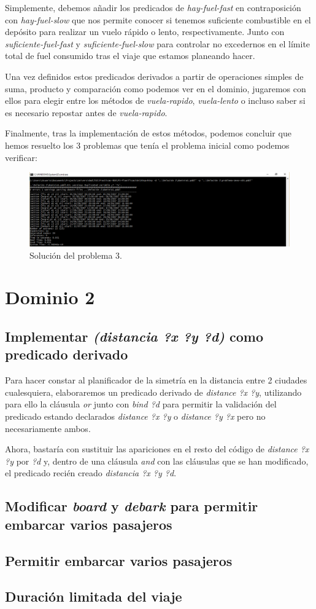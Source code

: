 \documentclass[a4paper, 11pt]{article}
\begin{document}
		Simplemente, debemos añadir los predicados de \textit{hay-fuel-fast} en contraposición con
		\textit{hay-fuel-slow} que nos permite conocer si tenemos suficiente combustible en el depósito
		para realizar un vuelo rápido o lento, respectivamente. Junto con \textit{suficiente-fuel-fast} y
		\textit{suficiente-fuel-slow} para controlar no excedernos en el límite total de fuel consumido tras
		el viaje que estamos planeando hacer.
		
		Una vez definidos estos predicados derivados a partir de operaciones simples de suma, producto y
		comparación como podemos ver en el dominio, jugaremos con ellos para elegir entre los métodos de
		\textit{vuela-rapido}, \textit{vuela-lento} o incluso saber si es necesario repostar antes de
		\textit{vuela-rapido}.
		
		Finalmente, tras la implementación de estos métodos, podemos concluir que hemos resuelto los 3
		problemas que tenía el problema inicial como podemos verificar:
		\begin{figure}[H]
			\centering
			\includegraphics[width=15cm]{Ej1-problema3.png}
			\caption{Solución del problema 3.}
			\label{Prob-3}
		\end{figure}

\section{Dominio 2}
	\subsection{Implementar \textit{(distancia ?x ?y ?d)} como predicado derivado}
	Para hacer constar al planificador de la simetría en la distancia entre 2 ciudades cualesquiera,
	elaboraremos un predicado derivado de \textit{distance ?x ?y}, utilizando para ello la cláusula
	\textit{or} junto con \textit{bind ?d} para permitir la validación del predicado estando declarados
	\textit{distance ?x ?y} o \textit{distance ?y ?x} pero no necesariamente ambos.
	
	Ahora, bastaría con sustituir las apariciones en el resto del código de \textit{distance ?x ?y}
	por \textit{?d} y, dentro de una cláusula \textit{and} con las cláusulas que se han modificado, el
	predicado recién creado \textit{distancia ?x ?y ?d}.
	
	\subsection{Modificar \textit{board} y \textit{debark} para permitir embarcar varios pasajeros}
	\subsection{Permitir embarcar varios pasajeros}
	\subsection{Duración limitada del viaje}
\end{document}
